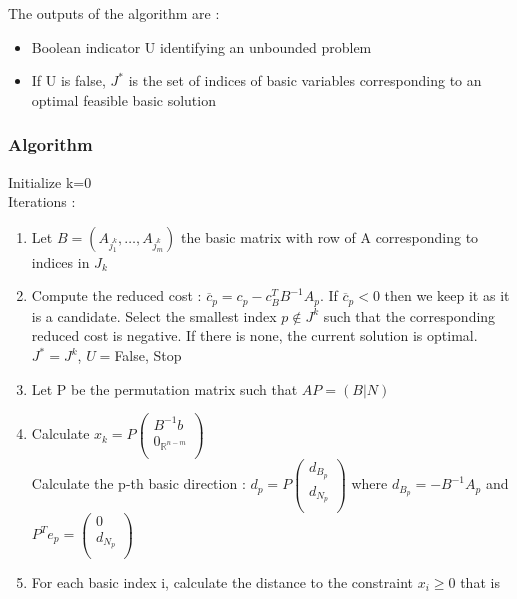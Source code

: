 \documentclass[../main.tex]{subfiles}
\begin{document}
The outputs of the algorithm are : \begin{itemize}
    \item Boolean indicator U identifying an unbounded problem\\
    \item If U is false, $J^*$ is the set of indices of basic variables corresponding to an optimal feasible basic solution\\
\end{itemize}

\subsubsection{Algorithm}
Initialize k=0\\
Iterations : \begin{enumerate}
    \item Let $B= (A_{j_1^k}, \dots, A_{j_m^k})$ the basic matrix with row of A corresponding to indices in $J_k$\\
    \item Compute the reduced cost : $\overline{c}_p = c_p-c_B^TB^{-1}A_p$. If $\overline{c}_p< 0$ then we keep it as it is a candidate. Select the smallest index $p\notin J^k$ such that the corresponding reduced cost is negative. If there is none, the current solution is optimal. $J^* = J^k$, $U=$False, Stop\\
    \item Let P be the permutation matrix such that $AP = (B|N)$\\
    \item Calculate $x_k = P\begin{pmatrix}
        B^{-1}b\\ 0_{\mathbb{R}^{n-m}}\\
    \end{pmatrix}$\\
    Calculate the p-th basic direction : $d_p = P\begin{pmatrix}
        d_{B_p}\\ d_{N_p}\\
    \end{pmatrix}$ where $d_{B_p} = -B^{-1}A_p$ and $P^T e_p = \begin{pmatrix}
        0 \\ d_{N_p}\\
    \end{pmatrix}$\\
    \item For each basic index i, calculate the distance to the constraint $x_i\geq 0$ that is \begin{equation}

\end{equation}
\end{enumerate}
\end{document}
